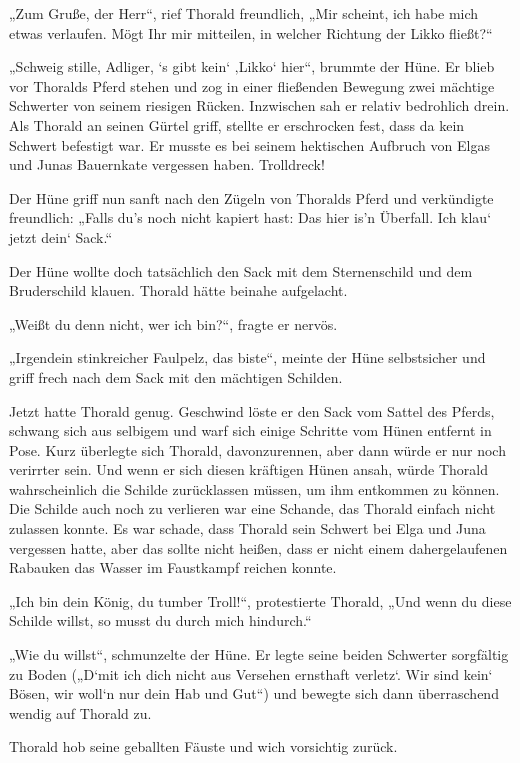 \documentclass[10pt, a4paper, oneside]{book}
\begin{document}
„Zum Gruße, der Herr“, rief Thorald freundlich, „Mir scheint, ich habe mich etwas verlaufen. Mögt Ihr mir mitteilen, in welcher Richtung der Likko fließt?“

„Schweig stille, Adliger, ‘s gibt kein‘ ‚Likko‘ hier“, brummte der Hüne. Er blieb vor Thoralds Pferd stehen und zog in einer fließenden Bewegung zwei mächtige Schwerter von seinem riesigen Rücken. Inzwischen sah er relativ bedrohlich drein. Als Thorald an seinen Gürtel griff, stellte er erschrocken fest, dass da kein Schwert befestigt war. Er musste es bei seinem hektischen Aufbruch von Elgas und Junas Bauernkate vergessen haben. Trolldreck!

Der Hüne griff nun sanft nach den Zügeln von Thoralds Pferd und verkündigte freundlich: „Falls du’s noch nicht kapiert hast: Das hier is’n Überfall. Ich klau‘ jetzt dein‘ Sack.“

Der Hüne wollte doch tatsächlich den Sack mit dem Sternenschild und dem Bruderschild klauen. Thorald hätte beinahe aufgelacht.

„Weißt du denn nicht, wer ich bin?“, fragte er nervös.

„Irgendein stinkreicher Faulpelz, das biste“, meinte der Hüne selbstsicher und griff frech nach dem Sack mit den mächtigen Schilden.

Jetzt hatte Thorald genug. Geschwind löste er den Sack vom Sattel des Pferds, schwang sich aus selbigem und warf sich einige Schritte vom Hünen entfernt in Pose. Kurz überlegte sich Thorald, davonzurennen, aber dann würde er nur noch verirrter sein. Und wenn er sich diesen kräftigen Hünen ansah, würde Thorald wahrscheinlich die Schilde zurücklassen müssen, um ihm entkommen zu können. Die Schilde auch noch zu verlieren war eine Schande, das Thorald einfach nicht zulassen konnte. Es war schade, dass Thorald sein Schwert bei Elga und Juna vergessen hatte, aber das sollte nicht heißen, dass er nicht einem dahergelaufenen Rabauken das Wasser im Faustkampf reichen konnte.

„Ich bin dein König, du tumber Troll!“, protestierte Thorald, „Und wenn du diese Schilde willst, so musst du durch mich hindurch.“

„Wie du willst“, schmunzelte der Hüne. Er legte seine beiden Schwerter sorgfältig zu Boden („D‘mit ich dich nicht aus Versehen ernsthaft verletz‘. Wir sind kein‘ Bösen, wir woll‘n nur dein Hab und Gut“) und bewegte sich dann überraschend wendig auf Thorald zu.

Thorald hob seine geballten Fäuste und wich vorsichtig zurück.
\end{document}
